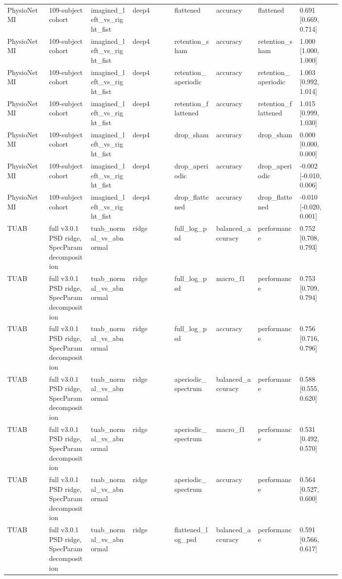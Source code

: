 \begin{longtable}{p{0.10\linewidth}p{0.10\linewidth}p{0.10\linewidth}p{0.10\linewidth}p{0.10\linewidth}p{0.10\linewidth}p{0.10\linewidth}p{0.10\linewidth}}
PhysioNet MI & 109-subject cohort & imagined\_left\_vs\_right\_fist & deep4 & flattened & accuracy & flattened & 0.691 [0.669, 0.714]\\
PhysioNet MI & 109-subject cohort & imagined\_left\_vs\_right\_fist & deep4 & retention\_sham & accuracy & retention\_sham & 1.000 [1.000, 1.000]\\
PhysioNet MI & 109-subject cohort & imagined\_left\_vs\_right\_fist & deep4 & retention\_aperiodic & accuracy & retention\_aperiodic & 1.003 [0.992, 1.014]\\
PhysioNet MI & 109-subject cohort & imagined\_left\_vs\_right\_fist & deep4 & retention\_flattened & accuracy & retention\_flattened & 1.015 [0.999, 1.030]\\
PhysioNet MI & 109-subject cohort & imagined\_left\_vs\_right\_fist & deep4 & drop\_sham & accuracy & drop\_sham & 0.000 [0.000, 0.000]\\
PhysioNet MI & 109-subject cohort & imagined\_left\_vs\_right\_fist & deep4 & drop\_aperiodic & accuracy & drop\_aperiodic & -0.002 [-0.010, 0.006]\\
PhysioNet MI & 109-subject cohort & imagined\_left\_vs\_right\_fist & deep4 & drop\_flattened & accuracy & drop\_flattened & -0.010 [-0.020, 0.001]\\
TUAB & full v3.0.1 PSD ridge, SpecParam decomposition & tuab\_normal\_vs\_abnormal & ridge & full\_log\_psd & balanced\_accuracy & performance & 0.752 [0.708, 0.793]\\
TUAB & full v3.0.1 PSD ridge, SpecParam decomposition & tuab\_normal\_vs\_abnormal & ridge & full\_log\_psd & macro\_f1 & performance & 0.753 [0.709, 0.794]\\
TUAB & full v3.0.1 PSD ridge, SpecParam decomposition & tuab\_normal\_vs\_abnormal & ridge & full\_log\_psd & accuracy & performance & 0.756 [0.716, 0.796]\\
TUAB & full v3.0.1 PSD ridge, SpecParam decomposition & tuab\_normal\_vs\_abnormal & ridge & aperiodic\_spectrum & balanced\_accuracy & performance & 0.588 [0.555, 0.620]\\
TUAB & full v3.0.1 PSD ridge, SpecParam decomposition & tuab\_normal\_vs\_abnormal & ridge & aperiodic\_spectrum & macro\_f1 & performance & 0.531 [0.492, 0.570]\\
TUAB & full v3.0.1 PSD ridge, SpecParam decomposition & tuab\_normal\_vs\_abnormal & ridge & aperiodic\_spectrum & accuracy & performance & 0.564 [0.527, 0.600]\\
TUAB & full v3.0.1 PSD ridge, SpecParam decomposition & tuab\_normal\_vs\_abnormal & ridge & flattened\_log\_psd & balanced\_accuracy & performance & 0.591 [0.566, 0.617]\\

\end{longtable}
